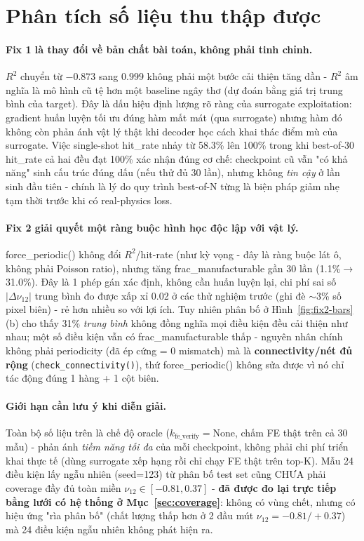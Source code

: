 \documentclass[11pt,a4paper]{article}
\begin{document}
\section{Phân tích số liệu thu thập được}
\label{sec:analysis}

\paragraph{Fix 1 là thay đổi về bản chất bài toán, không phải tinh chỉnh.}
$R^2$ chuyển từ $-0.873$ sang $0.999$ không phải một bước cải thiện tăng dần - $R^2$ âm nghĩa
là mô hình cũ tệ hơn một baseline ngây thơ (dự đoán bằng giá trị trung bình của target). Đây là
dấu hiệu định lượng rõ ràng của surrogate exploitation: gradient huấn luyện tối ưu đúng hàm mất
mát (qua surrogate) nhưng hàm đó không còn phản ánh vật lý thật khi decoder học cách khai thác
điểm mù của surrogate. Việc single-shot hit\_rate nhảy từ 58.3\% lên 100\% trong khi best-of-30
hit\_rate cả hai đều đạt 100\% xác nhận đúng cơ chế: checkpoint cũ vẫn "có khả năng" sinh cấu
trúc đúng dấu (nếu thử đủ 30 lần), nhưng không \emph{tin cậy} ở lần sinh đầu tiên - chính là lý
do quy trình best-of-N từng là biện pháp giảm nhẹ tạm thời trước khi có real-physics loss.

\paragraph{Fix 2 giải quyết một ràng buộc hình học độc lập với vật lý.} force\_periodic() không
đổi $R^2$/hit-rate (như kỳ vọng - đây là ràng buộc lát ô, không phải Poisson ratio), nhưng tăng
frac\_manufacturable gần 30 lần (1.1\%$\to$31.0\%). Đây là 1 phép gán xác định, không cần huấn
luyện lại, chi phí sai số $|\Delta\nu_{12}|$ trung bình đo được xấp xỉ 0.02 ở các thử nghiệm
trước (ghi đè $\sim$3\% số pixel biên) - rẻ hơn nhiều so với lợi ích. Tuy nhiên phân bố ở
Hình~\ref{fig:fix2-bars}(b) cho thấy 31\% \emph{trung bình} không đồng nghĩa mọi điều kiện đều
cải thiện như nhau; một số điều kiện vẫn có frac\_manufacturable thấp - nguyên nhân chính không
phải periodicity (đã ép cứng = 0 mismatch) mà là \textbf{connectivity/nét đủ rộng}
(\texttt{check\_connectivity()}), thứ force\_periodic() không sửa được vì nó chỉ tác động đúng 1
hàng + 1 cột biên.

\paragraph{Giới hạn cần lưu ý khi diễn giải.} Toàn bộ số liệu trên là chế độ oracle
($k_{\text{fe\_verify}}=$None, chấm FE thật trên cả 30 mẫu) - phản ánh \emph{tiềm năng tối đa}
của mỗi checkpoint, không phải chi phí triển khai thực tế (dùng surrogate xếp hạng rồi chỉ chạy
FE thật trên top-K). Mẫu 24 điều kiện lấy ngẫu nhiên (seed=123) từ phân bố test set cũng CHƯA phải
coverage đầy đủ toàn miền $\nu_{12}\in[-0.81, 0.37]$ - \textbf{đã được đo lại trực tiếp bằng lưới
có hệ thống ở Mục~\ref{sec:coverage}}: không có vùng chết, nhưng có hiệu ứng "rìa phân bố" (chất
lượng thấp hơn ở 2 đầu mút $\nu_{12}=-0.81/+0.37$) mà 24 điều kiện ngẫu nhiên không phát hiện ra.
\end{document}
